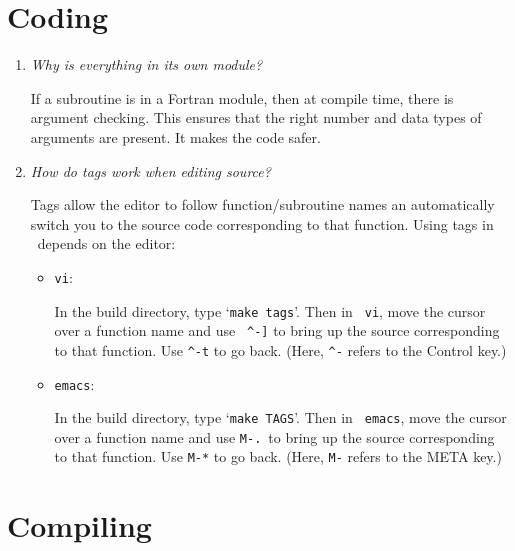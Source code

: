 \section{Coding}

\begin{enumerate}

\item {\em Why is everything in its own module?}

   If a subroutine is in a Fortran module, then at compile time, 
   there is argument checking.  This ensures that the right number
   and data types of arguments are present.  It makes the code safer.



\item {\em How do tags work when editing source?}

   Tags allow the editor to follow function/subroutine names an
   automatically switch you to the source code corresponding to that
   function.  Using tags in \maestro\ depends on the editor:

   \begin{itemize}

     \item {\tt vi}:

     In the build directory, type `{\tt make tags}'.  Then in {\tt
       vi}, move the cursor over a function name and use {\tt
       \verb|^|-]} to bring up the source corresponding to that
       function.  Use {\tt \verb|^|-t} to go back.  (Here, {\tt \verb|^|-}
       refers to the Control key.)

     \item {\tt emacs}:

     In the build directory, type `{\tt make TAGS}'.  Then in {\tt
       emacs}, move the cursor over a function name and use {\tt M-.}\
       to bring up the source corresponding to that function.  Use
       {\tt M-*} to go back.  (Here, {\tt M-} refers to the META key.)

   \end{itemize}

\end{enumerate}


\section{Compiling}

